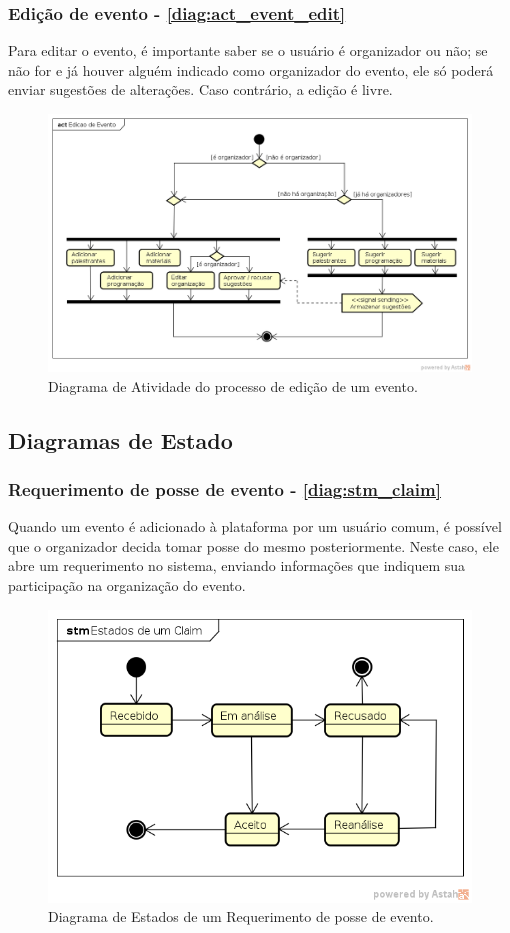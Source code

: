 \documentclass[12pt,a4paper,twoside,hyphens,english,brazil]{abntex2}
\begin{document}
{\subsubsection*{Edição de evento - \autoref{diag:act_event_edit}}
Para editar o evento, é importante saber se o usuário é organizador ou não; se não for e já houver alguém indicado como organizador do evento, ele só poderá enviar sugestões de alterações. Caso contrário, a edição é livre.
\begin{figure}
	\centering
	\includegraphics[width=1\linewidth]{diagramas/comuns/act_event_edit.png}
	\caption{Diagrama de Atividade do processo de edição de um evento.}
		\label{diag:act_event_edit}
\end{figure}

\subsection{Diagramas de Estado}

\subsubsection*{Requerimento de posse de evento - \autoref{diag:stm_claim}}
Quando um evento é adicionado à plataforma por um usuário comum, é possível que o organizador decida tomar posse do mesmo posteriormente. Neste caso, ele abre um requerimento no sistema, enviando informações que indiquem sua participação na organização do evento.

\begin{figure}
	\centering
	\includegraphics[width=0.8\linewidth]{diagramas/comuns/stm_claim.png}
	\caption{Diagrama de Estados de um Requerimento de posse de evento.}
	\label{diag:stm_claim}
\end{figure}

}
\end{document}
